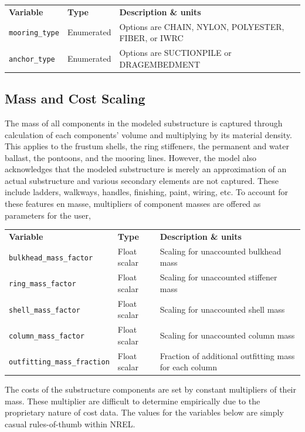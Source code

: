 {\footnotesize
  \begin{tabularx}{\linewidth}{ l l X }
    \textbf{Variable} & \textbf{Type} & \textbf{Description \& units} \\
    \texttt{mooring\_type} & Enumerated & Options are CHAIN, NYLON, POLYESTER, FIBER, or IWRC\\
    \texttt{anchor\_type} & Enumerated & Options are SUCTIONPILE or DRAGEMBEDMENT\\
  \end{tabularx}
}


\subsection{Mass and Cost Scaling}
The mass of all components in the modeled substructure is captured
through calculation of each components' volume and multiplying by its material
density.  This applies to the frustum shells, the ring stiffeners, the
permanent and water ballast, the pontoons, and the mooring lines.
However, the model also acknowledges that the modeled substructure is
merely an approximation of an actual substructure and various secondary
elements are not captured.  These include ladders, walkways, handles,
finishing, paint, wiring, etc.  To account for these features en masse,
multipliers of component masses are offered as parameters for the user,

{\footnotesize
  \begin{tabularx}{\linewidth}{ l l X }
    \textbf{Variable} & \textbf{Type} & \textbf{Description \& units} \\
    \texttt{bulkhead\_mass\_factor}     & Float scalar     & Scaling for unaccounted bulkhead mass\\
    \texttt{ring\_mass\_factor}         & Float scalar     & Scaling for unaccounted stiffener mass\\
    \texttt{shell\_mass\_factor}        & Float scalar     & Scaling for unaccounted shell mass\\
    \texttt{column\_mass\_factor}       & Float scalar    & Scaling for unaccounted column mass\\
    \texttt{outfitting\_mass\_fraction} & Float scalar    & Fraction of additional outfitting mass for each column\\
  \end{tabularx}
}

The costs of the substructure components are set by constant multipliers
of their mass.  These multiplier are difficult to determine empirically
due to the proprietary nature of cost data.  The values for the
variables below are simply casual rules-of-thumb within NREL.

